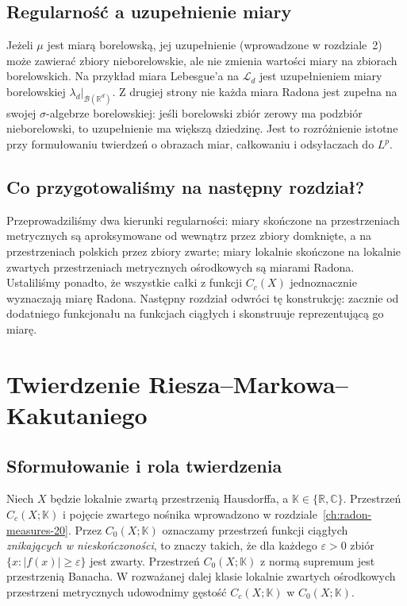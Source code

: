 \documentclass[11pt,a4paper,oneside]{book}
\numberwithin{equation}{chapter}
\theoremstyle{plain}
\theoremstyle{definition}
\theoremstyle{remark}
\begin{document}
\section{Regularność a uzupełnienie miary}
Jeżeli $\mu$ jest miarą borelowską, jej uzupełnienie
(wprowadzone w rozdziale~2) może zawierać zbiory
nieborelowskie, ale nie zmienia wartości miary
na zbiorach borelowskich. Na przykład miara Lebesgue'a
na $\mathcal L_d$ jest uzupełnieniem miary borelowskiej
$\lambda_d|_{\mathcal B(\mathbb R^d)}$. Z drugiej strony
nie każda miara Radona jest zupełna na swojej
$\sigma$-algebrze borelowskiej: jeśli borelowski zbiór
zerowy ma podzbiór nieborelowski, to uzupełnienie
ma większą dziedzinę. Jest to rozróżnienie
istotne przy formułowaniu twierdzeń o obrazach miar,
całkowaniu i odsyłaczach do $L^p$.

\section{Co przygotowaliśmy na następny rozdział?}
Przeprowadziliśmy dwa kierunki regularności:
miary skończone na przestrzeniach metrycznych są
aproksymowane od wewnątrz przez zbiory domknięte,
a na przestrzeniach polskich przez zbiory zwarte;
miary lokalnie skończone na lokalnie zwartych
przestrzeniach metrycznych ośrodkowych są miarami Radona.
Ustaliliśmy ponadto, że wszystkie całki z funkcji
$C_c(X)$ jednoznacznie wyznaczają miarę Radona.
Następny rozdział odwróci tę konstrukcję:
zacznie od dodatniego funkcjonału na funkcjach ciągłych
i skonstruuje reprezentującą go miarę.



\chapter{Twierdzenie Riesza--Markowa--Kakutaniego}
\label{ch:riesz-markov-21}

\section{Sformułowanie i rola twierdzenia}
Niech $X$ będzie lokalnie zwartą przestrzenią Hausdorffa,
a $\mathbb K\in\{\mathbb R,\mathbb C\}$.
Przestrzeń $C_c(X;\mathbb K)$ i pojęcie zwartego nośnika
wprowadzono w rozdziale~\ref{ch:radon-measures-20}.
Przez $C_0(X;\mathbb K)$ oznaczamy przestrzeń funkcji ciągłych
\emph{znikających w nieskończoności}, to znaczy takich, że
dla każdego $\varepsilon>0$ zbiór
$\{x:|f(x)|\ge\varepsilon\}$ jest zwarty.
Przestrzeń $C_0(X;\mathbb K)$ z normą supremum jest przestrzenią
Banacha. W rozważanej dalej klasie lokalnie zwartych
ośrodkowych przestrzeni metrycznych udowodnimy gęstość
$C_c(X;\mathbb K)$ w $C_0(X;\mathbb K)$.
\end{document}
